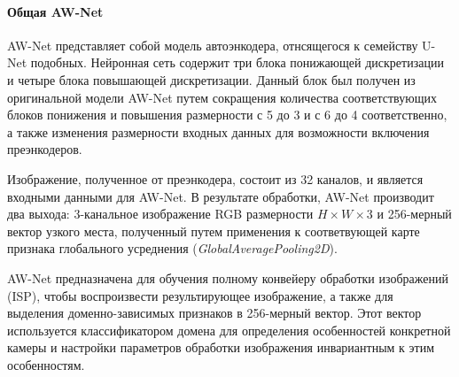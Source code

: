 \paragraph{Общая AW-Net}

AW-Net представляет собой модель автоэнкодера, отнсящегося к семейству U-Net подобных. Нейронная сеть содержит три блока понижающей дискретизации и четыре блока повышающей дискретизации. Данный блок был получен из оригинальной модели AW-Net путем сокращения количества соответствующих блоков понижения и повышения размерности с 5 до 3 и с 6 до 4 соответственно, а также изменения размерности входных данных для возможности включения преэнкодеров.

Изображение, полученное от преэнкодера, состоит из 32 каналов, и является входными данными для AW-Net. В результате обработки, AW-Net производит два выхода: 3-канальное изображение RGB размерности $H\times W\times 3$ и 256-мерный вектор узкого места, полученный путем применения к соответвующей карте признака глобального усреднения (\textit{GlobalAveragePooling2D}).

AW-Net предназначена для обучения полному конвейеру обработки изображений (ISP), чтобы воспроизвести результирующее изображение, а также для выделения доменно-зависимых признаков в 256-мерный вектор. Этот вектор используется классификатором домена для определения особенностей конкретной камеры и настройки параметров обработки изображения инвариантным к этим особенностям. 

